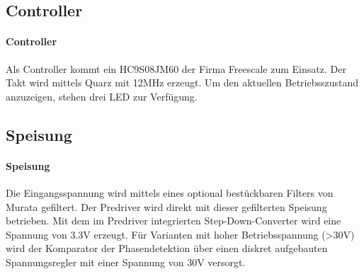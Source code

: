 \ifSTANDALONE
\subsection{Controller}
\fi
\ifEMBED
\paragraph{Controller}$~~$\vspace{2mm}\\
\fi
Als Controller kommt ein HC9S08JM60 der Firma Freescale zum Einsatz. Der Takt 
wird mittels Quarz mit 12MHz erzeugt. Um den aktuellen Betriebsszustand 
anzuzeigen, stehen drei LED zur Verfügung. 

\ifSTANDALONE
\subsection{Speisung}
\fi
\ifEMBED
\paragraph{Speisung}$~~$\vspace{2mm}\\
\fi
Die Eingangsspannung wird mittels eines optional bestückbaren Filters von 
Murata gefiltert. Der Predriver wird direkt mit dieser gefilterten Speisung 
betrieben. Mit dem im Predriver integrierten Step-Down-Converter wird eine 
Spannung von 3.3\si{\volt} erzeugt. Für Varianten mit hoher Betriebsspannung (>30\si{\volt}) 
wird der Komparator der Phasendetektion über einen diskret aufgebauten 
Spannungsregler mit einer Spannung von 30\si{\volt} versorgt. 

